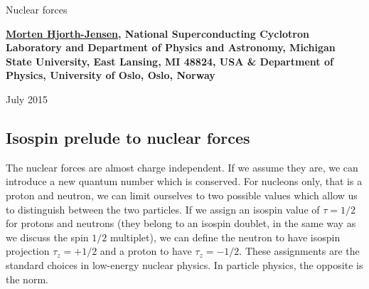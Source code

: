 \documentclass[%
oneside,                 %
final,                   %
10pt]{article}
\begin{document}






\thispagestyle{empty}

\begin{center}
{\LARGE\bf
\begin{spacing}{1.25}
Nuclear forces
\end{spacing}
}
\end{center}


\begin{center}
{\bf \href{{http://computationalphysics.no}}{Morten Hjorth-Jensen}, National Superconducting Cyclotron Laboratory and Department of Physics and Astronomy, Michigan State University, East Lansing, MI 48824, USA {\&} Department of Physics, University of Oslo, Oslo, Norway${}^{}$} \\ [0mm]
\end{center}

\begin{center}
\end{center}
    

\begin{center} %
July 2015
\end{center}

\vspace{1cm}


\subsection{Isospin prelude to nuclear  forces}
 The nuclear forces are almost charge independent. If we assume they are, 
we can introduce a new quantum number which is conserved. For nucleons only, that is a proton and neutron, we can limit ourselves
to two possible values which allow us to distinguish between the two particles. If we assign an isospin value of $\tau=1/2$ for protons
and neutrons (they belong to an isospin doublet, in the same way as we discuss the spin $1/2$ multiplet), we can define 
the neutron to have isospin projection $\tau_z=+1/2$ and a proton to have $\tau_z=-1/2$. These assignments are the standard choices in low-energy nuclear physics. In particle physics, the opposite is the norm. 
\end{document}
